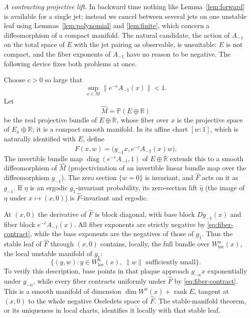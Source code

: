 \documentclass[11pt]{article}
\theoremstyle{remark}
\newcommand{\R}{\mathbb R}
\begin{document}
\emph{A contracting projective lift.}
In backward time nothing like Lemma~\ref{lem:forward} is available
for a single jet; instead we cancel between several jets
on one unstable leaf using Lemmas~\ref{lem:polynomial} and
\ref{lem:finite}, which concern a diffeomorphism of a compact
manifold.  The natural candidate, the action of \(A_{-1}\) on the
total space of \(E\) with the jet pairing as observable, is
unsuitable: \(E\) is not compact, and the fiber exponents of
\(A_{-1}\) have no reason to be negative.  The following device fixes
both problems at once.

Choose \(c>0\) so large that
\begin{equation}\label{eq:fiber-contract}
 \sup_{x\in M}\|e^{-c}A_{-1}(x)\|<1.
\end{equation}
Let
\[
 \widehat M=\mathbb P(E\oplus\R)
\]
be the real projective bundle of \(E\oplus\R\), whose fiber over
\(x\) is the projective space of \(E_x\oplus\R\); it is a compact
smooth manifold.
In its affine chart \([w:1]\), which is naturally identified with \(E\),
define
\begin{equation}\label{eq:lift}
 \widehat F(x,w)=\bigl(g_{-1}x,e^{-c}A_{-1}(x)w\bigr).
\end{equation}
The invertible bundle map \(\operatorname{diag}(e^{-c}A_{-1},1)\)
of \(E\oplus\R\) extends this to a smooth diffeomorphism of
\(\widehat M\) (projectivization of an invertible linear bundle map
over the diffeomorphism \(g_{-1}\)).
The zero section \(\{w=0\}\) is invariant, and \(\widehat F\) acts
on it as \(g_{-1}\).
If \(\eta\) is an ergodic \(g_1\)-invariant probability, its
zero-section lift \(\widehat\eta\) (the image of \(\eta\) under
\(x\mapsto(x,0)\)) is \(\widehat F\)-invariant and ergodic.

At \((x,0)\) the derivative of \(\widehat F\) is block diagonal, with
base block \(Dg_{-1}(x)\) and fiber block \(e^{-c}A_{-1}(x)\).
All fiber exponents are strictly negative by
\eqref{eq:fiber-contract}, while the base exponents are the negatives
of those of \(g_1\).  Thus the stable leaf of \(\widehat F\) through
\((x,0)\) contains, locally, the full bundle over
\(W^u_{\mathrm{loc}}(x)\), the local unstable manifold of \(g_1\):
\begin{equation}\label{eq:lifted-leaf}
 \{(y,w):y\in W^u_{\mathrm{loc}}(x),\ \|w\|\text{ sufficiently small}\}.
\end{equation}
To verify this description, base points in that plaque approach
\(g_{-n}x\) exponentially under \(g_{-n}\), while every fiber
contracts uniformly under \(\widehat F\) by \eqref{eq:fiber-contract}.
This is a smooth manifold of dimension
\(\dim W^u(x)+\operatorname{rank}E\), tangent at \((x,0)\) to the whole
negative Oseledets space of \(\widehat F\).
The stable-manifold theorem, or its uniqueness in local charts,
identifies it locally with that stable leaf.
\end{document}
